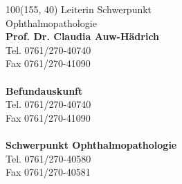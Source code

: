 \documentclass[12pt]{g-brief}
\begin{document}
{
\scriptsize
\begin{textblock}{100}(155, 40) 
Leiterin Schwerpunkt\\ Ophthalmopathologie\\
\textbf{Prof. Dr. Claudia Auw-Hädrich}\\
Tel. 0761/270-40740\\
Fax 0761/270-41090\\\\
\textbf{Befundauskunft}\\
Tel. 0761/270-40740\\
Fax 0761/270-41090\\\\
\textbf{Schwerpunkt Ophthalmopathologie}\\
Tel. 0761/270-40580\\
Fax 0761/270-40581
\end{textblock}
}

\begin{g-brief}
 \end{g-brief}
\end{document}
